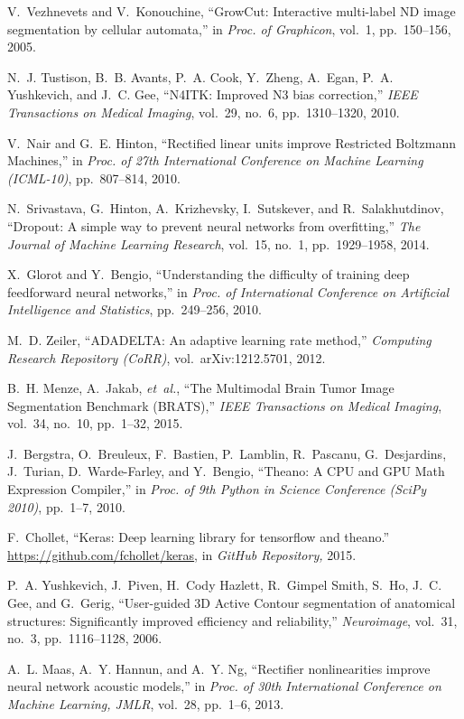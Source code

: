\documentclass[journal,twocolumn]{IEEEtran}
\begin{document}
\begin{thebibliography}{10}
V.~Vezhnevets and V.~Konouchine, ``{GrowCut: Interactive multi-label ND image
  segmentation by cellular automata},'' in {\em Proc. of Graphicon}, vol.~1,
  pp.~150--156, 2005.

N.~J. Tustison, B.~B. Avants, P.~A. Cook, Y.~Zheng, A.~Egan, P.~A. Yushkevich,
  and J.~C. Gee, ``{N4ITK: Improved N3 bias correction},'' {\em IEEE
  Transactions on Medical Imaging}, vol.~29, no.~6, pp.~1310--1320, 2010.

V.~Nair and G.~E. Hinton, ``{Rectified linear units improve Restricted
  Boltzmann Machines},'' in {\em Proc. of 27th International Conference on
  Machine Learning (ICML-10)}, pp.~807--814, 2010.

N.~Srivastava, G.~Hinton, A.~Krizhevsky, I.~Sutskever, and R.~Salakhutdinov,
  ``{Dropout: A simple way to prevent neural networks from overfitting},'' {\em
  The Journal of Machine Learning Research}, vol.~15, no.~1, pp.~1929--1958,
  2014.

X.~Glorot and Y.~Bengio, ``{Understanding the difficulty of training deep
  feedforward neural networks},'' in {\em Proc. of International Conference on
  Artificial Intelligence and Statistics}, pp.~249--256, 2010.

M.~D. Zeiler, ``{ADADELTA: A}n adaptive learning rate method,'' {\em Computing
  Research Repository {(CoRR)}}, vol.~arXiv:1212.5701, 2012.

B.~H. Menze, A.~Jakab, {\em et~al.}, ``{The Multimodal Brain Tumor Image
  Segmentation Benchmark (BRATS)},'' {\em IEEE Transactions on Medical
  Imaging}, vol.~34, no.~10, pp.~1--32, 2015.

J.~Bergstra, O.~Breuleux, F.~Bastien, P.~Lamblin, R.~Pascanu, G.~Desjardins,
  J.~Turian, D.~Warde-Farley, and Y.~Bengio, ``{Theano: A CPU and GPU Math
  Expression Compiler},'' in {\em Proc. of 9th Python in Science Conference
  (SciPy 2010)}, pp.~1--7, 2010.

F.~Chollet, ``Keras: Deep learning library for tensorflow and theano.''
  \url{https://github.com/fchollet/keras}, in \emph{GitHub Repository,} 2015.

P.~A. Yushkevich, J.~Piven, H.~{Cody Hazlett}, R.~{Gimpel Smith}, S.~Ho, J.~C.
  Gee, and G.~Gerig, ``{User-guided 3D Active Contour segmentation} of
  anatomical structures: {S}ignificantly improved efficiency and reliability,''
  {\em Neuroimage}, vol.~31, no.~3, pp.~1116--1128, 2006.

A.~L. Maas, A.~Y. Hannun, and A.~Y. Ng, ``{Rectifier nonlinearities improve
  neural network acoustic models},'' in {\em Proc. of 30th International
  Conference on Machine Learning, JMLR}, vol.~28, pp.~1--6, 2013.

\end{thebibliography}

%
\end{document}
